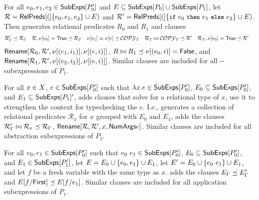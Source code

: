 For all $e_0, e_1, e_2 \in \subexps{ P_0' }$ and $E \subseteq
\subexps{ P_0 } \union \subexps{ P_1 }$, let $\mathcal{R} =
\symrelpreds(\elts{ e_0, e_1, e_2 } \union E)$ and $\mathcal{R}' =
\symrelpreds(\elts{ \ite{ e_0 }{ e_1 }{ e_2 } } \union E)$.
%
Then \verifybnd generates relational predicates $R_0$ and $R_1$ and
clauses
%
\begin{align*}
  \mathcal{R}'_{\Gamma} & \subtype \mathcal{R}_{\Gamma} &
  \mathcal{R}, \resvar{e_0} = \true & \subtype \mathcal{R}_T &
  \resvar{ e_1 } \equiv \resvar{ e } & \subtype \mathcal{COPY}_T &
  \mathcal{R}_T \joinctr \mathcal{COPY}_T & \subtype \mathcal{R}' &
  \mathcal{R}_T, \resvar{ e_0 } = \true & \subtype \mathcal{R}'
\end{align*}
%
$\renamesub{ \mathcal{R}_0 }{ \mathcal{ R }' }{ \resvar{ (e_1, i_1) }
}{ \resvar{(e, i)} }$,
%
$\ctrclause{ R }{ R_1 }{ \resvar{ (e_0, i) } = \false}$, and
%
$\renamesub{ \mathcal{R}_1 }{ \mathcal{ R }' }{ \resvar{ (e_2, i_2) }
}{ \resvar{ (e, i) } }$.
%
Similar clauses are included for all --
subexpressions of $P_1$.

For all $x \in \vars$, %
$e \in \subexps{ P_0' }$ such that $\lambda x. e \in
\subexps{P_0'}$, %
$E_0 \subseteq \subexps{P_0'}$, and %
$E_1 \subseteq \subexps{P_1}'$, \verifybnd adds clauses that solve
for a relational type of $x$, use it to strengthen the context for
typechecking the $e$.
%
I.e., \verifybnd generates a collection of relational predicates
$\mathcal{R}_x$ for $x$ grouped with $E_0$ and $E_1$, %
adds the clauses
$\mathcal{R}'_{\Gamma} \joinctr \mathcal{R}_x \subtype
\mathcal{R}_{\Gamma}$, %
$\renamesub{ \mathcal{R} }{ \mathcal{R}' }{ x }{ \argnum{e} }$.
%
Similar clauses are included for all abstraction subexpressions of
$P_1$.

For all $e_0, e_1 \in \subexps{P_0'}$ such that $e_0\ e_1 \in
\subexps{P_0'}$, %
$E_0 \subseteq \subexps{P_0'}$, and %
$E_1 \in \subexps{P_1'}$, let $E = E_0 \union \elts{ e_0, e_1 }
\union E_1$, %
let $E' = E_0 \union \elts{ e_0\ e_1 } \union E_1$, and %
let $f$ be a fresh variable with the same type as $x$.
%
\verifybnd adds the clauses 
$E_{\Gamma} \subtype E'_{\Gamma}$ and %
$\replace{ E }{ \firstarg{e_0} }{ f } \subtype \replace{ E }{ e_1 }{ f
}$.
%
%
Similar clauses are included for all application subexpressions of
$P_1$.

